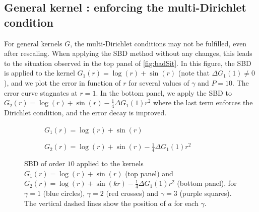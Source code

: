 \documentclass[smallextended]{svjour3}
\begin{document}
\subsection{General kernel : enforcing the multi-Dirichlet condition}
\label{begal1}
For general kernels $G$, the multi-Dirichlet conditions may not be fulfilled, even after rescaling. When applying the SBD method without any changes, this leads to the situation observed in the top panel of \autoref{fig:badSit}. In this figure, the SBD is applied to the kernel $G_1(r) = \log(r) + \sin(r)$ (note that $\Delta G_1(1) \neq 0$), and we plot the error in function of $r$ for several values of $\gamma$ and $P = 10$. The error curve stagnates at $r=1$. In the bottom panel, we apply the SBD to $G_2(r) = \log(r) + \sin(r) - \frac{1}{4}\Delta G_1(1)r^2$ where the last term enforces the Dirichlet condition, and the error decay is improved. 

\begin{figure}[h]	
	\centering
	\setlength{\plotwidth}{\textwidth}
	\begin{subfigure}[b]{\plotwidth}
		\centering
		
		\caption{$G_1(r) = \log(r) + \sin(r)$}
	\end{subfigure}
	
	\begin{subfigure}[b]{\plotwidth}
		\centering
		
		\caption{$G_2(r) = \log(r) + \sin(r) - \frac{1}{4}\Delta G_1(1)r^2$}		
	\end{subfigure}
	\caption{SBD of order $10$ applied to the kernels $G_1(r) = \log(r) + \sin(r)$ (top panel) and $G_2(r) = \log(r) + \sin(kr) - \frac{1}{4}\Delta G_1(1)r^2$ (bottom panel), for $\gamma = 1$ (blue circles), $\gamma = 2$ (red crosses) and $\gamma = 3$ (purple squares). The vertical dashed lines show the position of $a$ for each $\gamma$.}
	\label{fig:badSit}
\end{figure}
\end{document}
